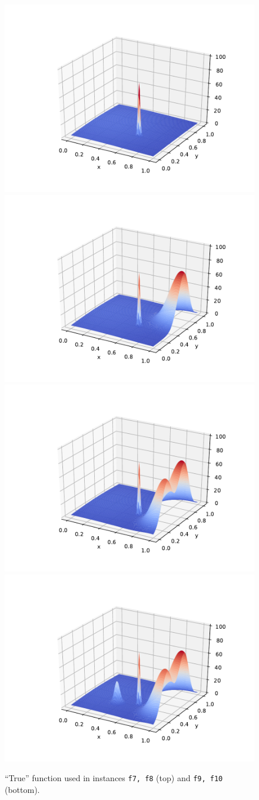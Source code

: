 \documentclass[smallextended]{svjour3}
\begin{document}
\begin{figure}[!hbtp]
  \centering
  \includegraphics[width=.33\textwidth,trim=100 30 50 50,clip=True]{f7.pdf}
  \includegraphics[width=.33\textwidth,trim=100 30 50 50,clip=True]{f8.pdf}
  \includegraphics[width=.33\textwidth,trim=100 30 50 50,clip=True]{f9.pdf}
  \includegraphics[width=.33\textwidth,trim=100 30 50 50,clip=True]{f10.pdf}
  \caption{``True'' function used in instances \texttt{f7, f8} (top) and \texttt{f9, f10} (bottom).}
  \label{fig:fB}
\end{figure}
\end{document}
